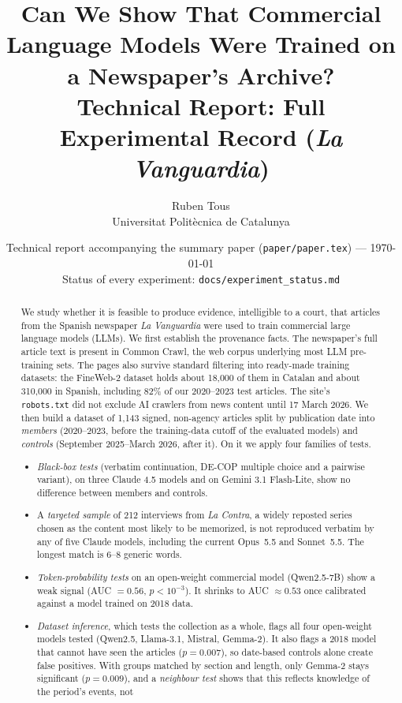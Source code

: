 \documentclass[10pt,a4paper]{article}
\title{Can We Show That Commercial Language Models Were Trained on a Newspaper's Archive?\\
\large Technical Report: Full Experimental Record (\emph{La Vanguardia})}
\author{Ruben Tous\\ \small Universitat Polit\`ecnica de Catalunya}
\date{\small Technical report accompanying the summary paper (\texttt{paper/paper.tex}) --- \today\\
Status of every experiment: \texttt{docs/experiment\_status.md}}
\begin{document}
\maketitle

\begin{abstract}
We study whether it is feasible to produce evidence, intelligible to a court, that articles from the Spanish
newspaper \emph{La Vanguardia} were used to train commercial large language models (LLMs). We first establish the
provenance facts. The newspaper's full article text is present in Common Crawl, the web corpus underlying most LLM
pre-training sets. The pages also survive standard filtering into ready-made training datasets: the FineWeb-2
dataset holds about 18,000 of them in Catalan and about 310,000 in Spanish, including 82\% of our 2020--2023 test
articles. The site's \texttt{robots.txt} did not exclude AI crawlers from news content until
17 March 2026. We then build a dataset of 1,143 signed, non-agency articles split by publication date into
\emph{members} (2020--2023, before the training-data cutoff of the evaluated models) and \emph{controls}
(September 2025--March 2026, after it). On it we apply four families of tests.
\begin{itemize}
\item \emph{Black-box tests} (verbatim continuation, DE-COP multiple choice and a pairwise variant), on three Claude 4.5
models and on Gemini 3.1 Flash-Lite, show no difference between members and controls.
\item A \emph{targeted sample} of 212 interviews from \emph{La Contra}, a widely reposted series chosen as the content
most likely to be memorized, is not reproduced verbatim by any of five Claude models, including the current Opus~5.5
and Sonnet~5.5. The longest match is 6--8 generic words.
\item \emph{Token-probability tests} on an open-weight commercial model (Qwen2.5-7B) show a weak signal
(AUC $=0.56$, $p<10^{-3}$). It shrinks to AUC $\approx0.53$ once calibrated against a model trained on 2018 data.
\item \emph{Dataset inference}, which tests the collection as a whole, flags all four open-weight models tested
(Qwen2.5, Llama-3.1, Mistral, Gemma-2). It also flags a 2018 model that cannot have seen the articles ($p=0.007$),
so date-based controls alone create false positives. With groups matched by section and length, only Gemma-2 stays
significant ($p=0.009$), and a \emph{neighbour test} shows that this reflects knowledge of the period's events, not

\end{itemize}
\end{abstract}
\end{document}
